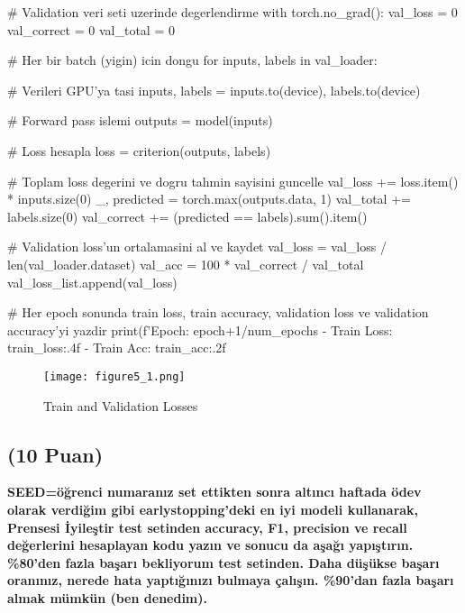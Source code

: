 \documentclass[11pt]{article}
\begin{document}
\begin{python}
    # Validation veri seti uzerinde degerlendirme
    with torch.no_grad():
        val_loss = 0
        val_correct = 0
        val_total = 0

        # Her bir batch (yigin) icin dongu
        for inputs, labels in val_loader:
        
            # Verileri GPU'ya tasi
            inputs, labels = inputs.to(device), labels.to(device)
            
            # Forward pass islemi
            outputs = model(inputs)
            
            # Loss hesapla
            loss = criterion(outputs, labels)

            # Toplam loss degerini ve dogru tahmin sayisini guncelle
            val_loss += loss.item() * inputs.size(0)
            _, predicted = torch.max(outputs.data, 1)
            val_total += labels.size(0)
            val_correct += (predicted == labels).sum().item()
            
        # Validation loss'un ortalamasini al ve kaydet
        val_loss = val_loss / len(val_loader.dataset)
        val_acc = 100 * val_correct / val_total
        val_loss_list.append(val_loss)
        
    # Her epoch sonunda train loss, train accuracy, validation loss ve validation accuracy'yi yazdir
    print(f'Epoch: {epoch+1}/{num_epochs} - Train Loss: {train_loss:.4f} - Train Acc: {train_acc:.2f}%
\end{python}

\newpage
\vspace{.3in}
\begin{figure}[ht!]
    \centering
    \texttt{[image: figure5\_1.png]}
    \caption{Train and Validation Losses}
    \label{fig:my_pic}
\end{figure}


\vspace{.6in}
\subsection{(10 Puan)} \textbf{SEED=öğrenci numaranız set ettikten sonra altıncı haftada ödev olarak verdiğim gibi earlystopping'deki en iyi modeli kullanarak, Prensesi İyileştir test setinden accuracy, F1, precision ve recall değerlerini hesaplayan kodu yazın ve sonucu da aşağı yapıştırın. \%80'den fazla başarı bekliyorum test setinden. Daha düşükse başarı oranınız, nerede hata yaptığınızı bulmaya çalışın. \%90'dan fazla başarı almak mümkün (ben denedim).}
\end{document}
